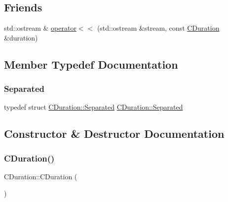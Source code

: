 \subsection*{Friends}
\begin{DoxyCompactItemize}
\item 
std\+::ostream \& \mbox{\hyperlink{class_c_duration_acbd3966012525c6563be675ce44b6c06}{operator$<$$<$}} (std\+::ostream \&stream, const \mbox{\hyperlink{class_c_duration}{C\+Duration}} \&duration)
\end{DoxyCompactItemize}


\subsection{Member Typedef Documentation}
\mbox{\label{class_c_duration_ab058caef213b4224494f8a9ef71db78a}} 
\subsubsection{\texorpdfstring{Separated}{Separated}}
{\footnotesize\ttfamily typedef struct \mbox{\hyperlink{struct_c_duration_1_1_separated}{C\+Duration\+::\+Separated}}  \mbox{\hyperlink{struct_c_duration_1_1_separated}{C\+Duration\+::\+Separated}}}



\subsection{Constructor \& Destructor Documentation}
\mbox{\label{class_c_duration_a5d2b1b889b86db60fc9e36ca9dc32673}} 
\subsubsection{\texorpdfstring{C\+Duration()}{CDuration()}\hspace{0.1cm}{\footnotesize\ttfamily [1/2]}}
{\footnotesize\ttfamily C\+Duration\+::\+C\+Duration (\begin{DoxyParamCaption}{ }\end{DoxyParamCaption})}

\mbox{\label{class_c_duration_a45d12f047efd2fdef5b410f5b28be1b7}} 
